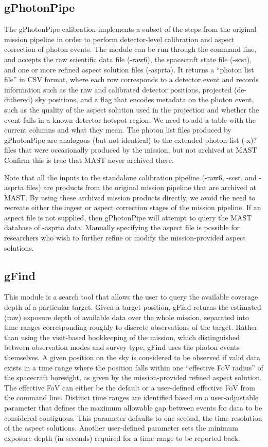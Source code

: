 \documentclass[5p]{elsarticle}
\begin{document}
\subsection{gPhotonPipe}
The gPhotonPipe calibration implements a subset of the steps from the original mission pipeline in order to perform detector-level calibration and aspect correction of photon events. The module can be run through the command line, and accepts the raw scientific data file (-raw6), the spacecraft state file (-scst), and one or more refined aspect solution files (-asprta). It returns a ``photon list file'' in CSV format, where each row corresponds to a detector event and records information such as the raw and calibrated detector positions, projected (de-dithered) sky positions, and a flag that encodes metadata on the photon event, such as the quality of the aspect solution used in the projection and whether the event falls in a known detector hotspot region.  {\color{red}We need to add a table with the current columns and what they mean.} The photon list files produced by gPhotonPipe are analogous (but not identical) to the extended photon list {\color{red}(-x)?} files that were occasionally produced by the mission, but not archived at MAST {\color{red}Confirm this is true that MAST never archived these.}

Note that all the inputs to the standalone calibration pipeline (-raw6, -scst, and -asprta files) are products from the original mission pipeline that are archived at MAST.  By using these archived mission products directly, we avoid the need to recreate either the ingest or aspect correction stages of the mission pipeline. If an aspect file is not supplied, then gPhotonPipe will attempt to query the MAST database of -asprta data.  Manually specifying the aspect file is possible for researchers who wish to further refine or modify the mission-provided aspect solutions.

\subsection{gFind}
This module is a search tool that allows the user to query the available coverage depth of a particular target. Given a target position, gFind returns the estimated (raw) exposure depth of available data over the whole mission, separated into time ranges corresponding roughly to discrete observations of the target. Rather than using the visit-based bookkeeping of the mission, which distinguished between observation modes and survey type, gFind uses the photon events themselves. A given position on the sky is considered to be observed if valid data exists in a time range where the position falls within one ``effective FoV radius'' of the spacecraft boresight, as given by the mission-provided refined aspect solution.  The effective FoV can either be the default or a user-defined effective FoV from the command line.  Distinct time ranges are identified based on a user-adjustable parameter that defines the maximum allowable gap between events for data to be considered contiguous.  This parameter defaults to one second, the time resolution of the aspect solutions. Another user-defined parameter sets the minimum exposure depth (in seconds) required for a time range to be reported back.
\end{document}
